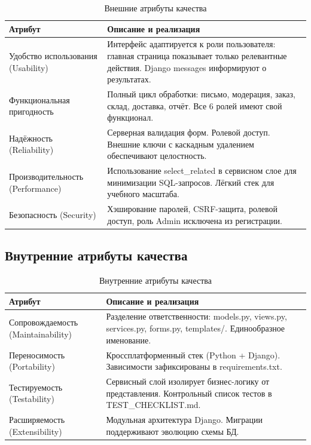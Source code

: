\documentclass[14pt,a4paper]{extarticle}
\begin{document}
\begin{table}[H]
\centering
\caption{Внешние атрибуты качества}
\label{tab:ext_quality}
\small
\begin{tabular}{|L{3.8cm}|L{9cm}|}
\hline
\textbf{Атрибут} & \textbf{Описание и реализация} \\
\hline
Удобство использования (Usability) & Интерфейс адаптируется к роли пользователя: главная страница показывает только релевантные действия. Django messages информируют о результатах. \\
\hline
Функциональная пригодность & Полный цикл обработки: письмо, модерация, заказ, склад, доставка, отчёт. Все 6 ролей имеют свой функционал. \\
\hline
Надёжность (Reliability) & Серверная валидация форм. Ролевой доступ. Внешние ключи с каскадным удалением обеспечивают целостность. \\
\hline
Производительность (Performance) & Использование select\_related в сервисном слое для минимизации SQL-запросов. Лёгкий стек для учебного масштаба. \\
\hline
Безопасность (Security) & Хэширование паролей, CSRF-защита, ролевой доступ, роль Admin исключена из регистрации. \\
\hline
\end{tabular}
\end{table}

\subsection{Внутренние атрибуты качества}

\begin{table}[H]
\centering
\caption{Внутренние атрибуты качества}
\label{tab:int_quality}
\small
\begin{tabular}{|L{3.8cm}|L{9cm}|}
\hline
\textbf{Атрибут} & \textbf{Описание и реализация} \\
\hline
Сопровождаемость (Maintainability) & Разделение ответственности: models.py, views.py, services.py, forms.py, templates/. Единообразное именование. \\
\hline
Переносимость (Portability) & Кроссплатформенный стек (Python + Django). Зависимости зафиксированы в requirements.txt. \\
\hline
Тестируемость (Testability) & Сервисный слой изолирует бизнес-логику от представления. Контрольный список тестов в TEST\_CHECKLIST.md. \\
\hline
Расширяемость (Extensibility) & Модульная архитектура Django. Миграции поддерживают эволюцию схемы БД. \\
\hline
\end{tabular}
\end{table}
\end{document}
